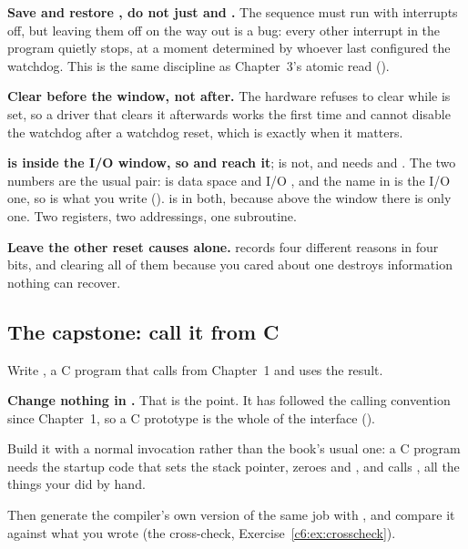 \textbf{Save and restore , do not just  and .} The sequence must run
with interrupts off, but leaving them off on the way out is a bug: every other interrupt in the
program quietly stops, at a moment determined by whoever last configured the watchdog. This is the
same discipline as Chapter~3's atomic read ().

\textbf{Clear  before the window, not after.} The hardware refuses to clear 
while  is set, so a driver that clears it afterwards works the first time and cannot
disable the watchdog after a watchdog reset, which is exactly when it matters.

\textbf{ is inside the I/O window, so  and  reach it}; 
is not, and needs  and . The two numbers are the usual pair:  is
data space  and I/O , and the name in  is the I/O one, so
 is what you write ().  is  in
both, because above the window there is only one. Two registers, two addressings, one subroutine.

\textbf{Leave the other reset causes alone.}  records four different reasons in four
bits, and clearing all of them because you cared about one destroys information nothing can
recover.

\subsection{The capstone: call it from C}
\label{c6:sec:capstone}
Write , a C program that calls  from Chapter~1 and uses
the result.

\textbf{Change nothing in .} That is the point. It has followed the calling
convention since Chapter~1, so a C prototype is the whole of the interface
().

Build it with a normal  invocation rather than the book's usual one: a C program
needs the startup code that sets the stack pointer, zeroes  and , and calls
, all the things your  did by hand.

Then generate the compiler's own version of the same job with , and compare it against
what you wrote (the cross-check, Exercise~\ref{c6:ex:crosscheck}).


